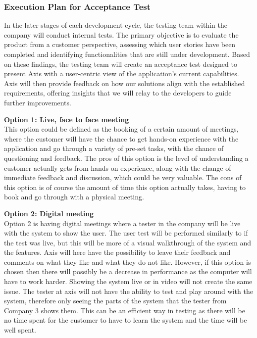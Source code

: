 \documentclass{article}
\begin{document}
\subsubsection{Execution Plan for Acceptance Test}
In the later stages of each development cycle, the testing team within the company will conduct internal tests. The primary objective is to evaluate the product from a customer perspective, assessing which user stories have been completed and identifying functionalities that are still under development. Based on these findings, the testing team will create an acceptance test designed to present Axis with a user-centric view of the application's current capabilities. Axis will then provide feedback on how our solutions align with the established requirements, offering insights that we will relay to the developers to guide further improvements.

\textbf{Option 1: Live, face to face meeting}\\
This option could be defined as the booking of a certain amount of meetings, where the customer will have the chance to get hands-on experience with the application and go through a variety of pre-set tasks, with the chance of questioning and feedback. The pros of this option is the level of understanding a customer actually gets from hands-on experience, along with the change of immediate feedback and discussion, which could be very valuable. The cons of this option is of course the amount of time this option actually takes, having to book and go through with a physical meeting.

\textbf{Option 2: Digital meeting}\\
Option 2 is having digital meetings where a tester in the company will be live with the system to show the user. The user test will be performed similarly to if the test was live, but this will be more of a visual walkthrough of the system and the features. Axis will here have the possibility to leave their feedback and comments on what they like and what they do not like. However, if this option is chosen then there will possibly be a decrease in performance as the computer will have to work harder. Showing the system live or in video will not create the same issue. The tester at axis will not have the ability to test and play around with the system, therefore only seeing the parts of the system that the tester from Company 3 shows them. This can be an efficient way in testing as there will be no time spent for the customer to have to learn the system and the time will be well spent. 
\end{document}

